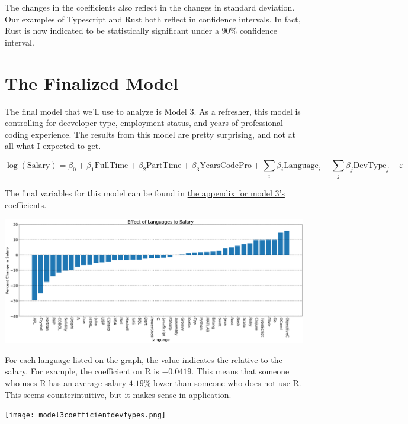 \documentclass{report}
\begin{document}
The changes in the coefficients also reflect in the changes in standard deviation. Our examples of Typescript and Rust both reflect in confidence intervals. In fact, Rust is now indicated to be statistically significant under a $90\%$ confidence interval.


\newpage
\section{The Finalized Model}

The final model that we'll use to analyze is Model 3. As a refresher, this model is controlling for deeveloper type, employment status, and years of professional coding experience. The results from this model are pretty surprising, and not at all what I expected to get.

$$\log({\text{Salary}}) = \beta_0 + \beta_1 \text{FullTime} + \beta_2 \text{PartTime} + \beta_3 \text{YearsCodePro} + \sum_i{\beta_i \text{Language}_i} + \sum_j{\beta_j \text{DevType}_j} + \varepsilon$$

The final variables for this model can be found in \hyperref[data:model3]{the appendix for model 3's coefficients}.

\vspace{0.5in}

\includegraphics[width=0.9\linewidth]{model3coefficientlanguages.png}

\vspace{0.5in}

For each language listed on the graph, the value indicates the relative to the salary. For example, the coefficient on R is $-0.0419$. This means that someone who uses R has an average salary $4.19\%$ lower than someone who does not use R. This seems counterintuitive, but it makes sense in application.

\vspace{0.5in}

\texttt{[image: model3coefficientdevtypes.png]}

\vspace{0.5in}
\end{document}
